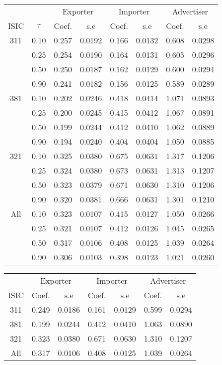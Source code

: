 \documentclass[11pt]{article}
\begin{document}
\begin{table}[H]
\centering
\begin{tabular}{cccccccc}
  \hline\hline & & \multicolumn{2}{c}{Exporter}  & \multicolumn{2}{c}{Importer} & \multicolumn{2}{c}{Advertiser} \\ \cmidrule(lr){3-4} \cmidrule(lr){5-6} \cmidrule(lr){7-8}ISIC & $\tau$ & Coef. & s.e & Coef. & s.e & Coef. & s.e \\ 
  \hline
311 & 0.10 & 0.257 & 0.0192 & 0.166 & 0.0132 & 0.608 & 0.0298 \\ 
   & 0.25 & 0.254 & 0.0190 & 0.164 & 0.0131 & 0.605 & 0.0296 \\ 
   & 0.50 & 0.250 & 0.0187 & 0.162 & 0.0129 & 0.600 & 0.0294 \\ 
   & 0.90 & 0.241 & 0.0182 & 0.156 & 0.0125 & 0.589 & 0.0289 \\ 
  381 & 0.10 & 0.202 & 0.0246 & 0.418 & 0.0414 & 1.071 & 0.0893 \\ 
   & 0.25 & 0.200 & 0.0245 & 0.415 & 0.0412 & 1.067 & 0.0891 \\ 
   & 0.50 & 0.199 & 0.0244 & 0.412 & 0.0410 & 1.062 & 0.0889 \\ 
   & 0.90 & 0.194 & 0.0240 & 0.404 & 0.0404 & 1.050 & 0.0885 \\ 
  321 & 0.10 & 0.325 & 0.0380 & 0.675 & 0.0631 & 1.317 & 0.1206 \\ 
   & 0.25 & 0.324 & 0.0380 & 0.673 & 0.0631 & 1.313 & 0.1207 \\ 
   & 0.50 & 0.323 & 0.0379 & 0.671 & 0.0630 & 1.310 & 0.1206 \\ 
   & 0.90 & 0.320 & 0.0381 & 0.666 & 0.0631 & 1.301 & 0.1210 \\ 
  All & 0.10 & 0.323 & 0.0107 & 0.415 & 0.0127 & 1.050 & 0.0266 \\ 
   & 0.25 & 0.321 & 0.0107 & 0.412 & 0.0126 & 1.045 & 0.0265 \\ 
   & 0.50 & 0.317 & 0.0106 & 0.408 & 0.0125 & 1.039 & 0.0264 \\ 
   & 0.90 & 0.306 & 0.0103 & 0.398 & 0.0123 & 1.021 & 0.0260 \\ 
   \hline
\end{tabular}
\end{table}

\begin{table}[H]
\centering
\begin{tabular}{ccccccc}
  \hline\hline & \multicolumn{2}{c}{Exporter}  & \multicolumn{2}{c}{Importer} & \multicolumn{2}{c}{Advertiser} \\ \cmidrule(lr){2-3} \cmidrule(lr){4-5} \cmidrule(lr){6-7}ISIC & Coef. & s.e & Coef. & s.e & Coef. & s.e \\ 
  \hline
311 & 0.249 & 0.0186 & 0.161 & 0.0129 & 0.599 & 0.0294 \\ 
  381 & 0.199 & 0.0244 & 0.412 & 0.0410 & 1.063 & 0.0890 \\ 
  321 & 0.323 & 0.0380 & 0.671 & 0.0630 & 1.310 & 0.1207 \\ 
  All & 0.317 & 0.0106 & 0.408 & 0.0125 & 1.039 & 0.0264 \\ 
   \hline
\end{tabular}
\end{table}
\end{document}
